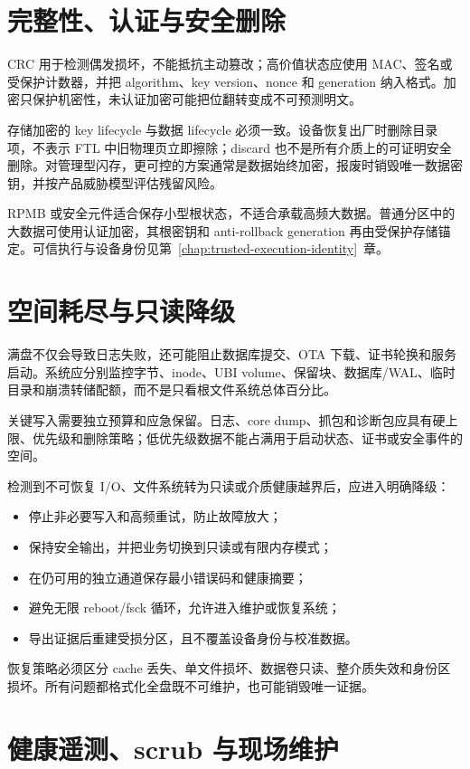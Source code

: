 \section{完整性、认证与安全删除}

CRC 用于检测偶发损坏，不能抵抗主动篡改；高价值状态应使用 MAC、签名或受保护计数器，并把 algorithm、key version、nonce 和 generation 纳入格式。加密只保护机密性，未认证加密可能把位翻转变成不可预测明文。

存储加密的 key lifecycle 与数据 lifecycle 必须一致。设备恢复出厂时删除目录项，不表示 FTL 中旧物理页立即擦除；discard 也不是所有介质上的可证明安全删除。对管理型闪存，更可控的方案通常是数据始终加密，报废时销毁唯一数据密钥，并按产品威胁模型评估残留风险。

RPMB 或安全元件适合保存小型根状态，不适合承载高频大数据。普通分区中的大数据可使用认证加密，其根密钥和 anti-rollback generation 再由受保护存储锚定。可信执行与设备身份见\mbox{第~\ref{chap:trusted-execution-identity}~章}。

\section{空间耗尽与只读降级}

满盘不仅会导致日志失败，还可能阻止数据库提交、OTA 下载、证书轮换和服务启动。系统应分别监控字节、inode、UBI volume、保留块、数据库/WAL、临时目录和崩溃转储配额，而不是只看根文件系统总体百分比。

关键写入需要独立预算和应急保留。日志、core dump、抓包和诊断包应具有硬上限、优先级和删除策略；低优先级数据不能占满用于启动状态、证书或安全事件的空间。

检测到不可恢复 I/O、文件系统转为只读或介质健康越界后，应进入明确降级：

\begin{itemize}
  \item 停止非必要写入和高频重试，防止故障放大；
  \item 保持安全输出，并把业务切换到只读或有限内存模式；
  \item 在仍可用的独立通道保存最小错误码和健康摘要；
  \item 避免无限 reboot/fsck 循环，允许进入维护或恢复系统；
  \item 导出证据后重建受损分区，且不覆盖设备身份与校准数据。
\end{itemize}

恢复策略必须区分 cache 丢失、单文件损坏、数据卷只读、整介质失效和身份区损坏。所有问题都格式化全盘既不可维护，也可能销毁唯一证据。

\section{健康遥测、scrub 与现场维护}

